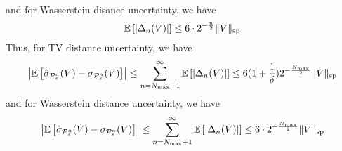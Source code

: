     and for Wasserstein disance uncertainty, we have
    \begin{equation}  \label{eq:DeltaabsboundWasserstein}
    \mathbb{E}\left[\left | \Delta_n(V) \right |\right]  \leq 6\cdot 2^{-\frac{n}{2}}\|V\|_{\mathrm{sp}}
    \end{equation}     
    Thus, for TV distance uncertainty, we have
    \begin{equation} \label{eq:sigmabiasboundTV}
         \left | \mathbb{E}\left[\hat{\sigma}_{\mathcal{P}^a_s}(V) - {\sigma}_{\mathcal{P}^a_s}(V)\right]  \right | \leq \sum_{n=N_{\max}+1}^{\infty}\mathbb{E}\left[\left | \Delta_n(V) \right |\right]  \leq 6(1+\frac{1}{\delta}) 2^{-\frac{N_{\max}}{2}}\|V\|_{\mathrm{sp}}
    \end{equation}
    and for Wasserstein distance uncertainty, we have
    \begin{equation} \label{eq:sigmabiasboundWasserstein}
         \left | \mathbb{E}\left[\hat{\sigma}_{\mathcal{P}^a_s}(V) - {\sigma}_{\mathcal{P}^a_s}(V)\right]  \right | \leq \sum_{n=N_{\max}+1}^{\infty}\mathbb{E}\left[\left | \Delta_n(V) \right |\right]  \leq 6\cdot2^{-\frac{N_{\max}}{2}}\|V\|_{\mathrm{sp}}
    \end{equation}
    
